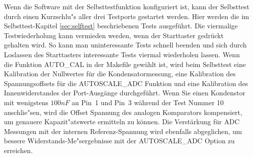 Wenn die Software mit der Selbsttestfunktion konfiguriert ist, kann der Selbsttest durch einen Kurzschlu"s aller drei
Testports gestartet werden.
Hier werden die im Selbsttest-Kapitel \ref{sec:selftest} beschriebenen Tests ausgef\"uhrt. Die viermalige Testwiederholung
kann vermieden werden, wenn der Starttaster gedr\"uckt gehalten wird. So kann man uninteressante Tests schnell beenden und
sich durch Loslassen des Starttasters interessante Tests viermal wiederholen lassen.
Wenn die Funktion AUTO\_CAL in der Makefile gew\"ahlt ist, wird beim Selbsttest eine Kalibration der Nullwertes f\"ur die
Kondensatormessung, eine Kalibration des Spannungsoffsets f\"ur die AUTOSCALE\_ADC Funktion  und 
eine Kalibration des Innenwiderstandes der Port-Ausg\"ange durchgef\"uhrt.
Wenn Sie einen Kondenstor mit wenigstens \(100 nF\) an Pin~1 und Pin~3 w\"ahrend der Test Nummer 10 anschlie"sen,
wird die Offset Spannung des analogen Komparators kompensiert, um genauere Kapazit"atswerte ermitteln zu k\"onnen.
Die Verst\"arkung f\"ur ADC Messungen mit der internen Referenz-Spannung wird ebenfalls abgeglichen, um
bessere Widerstands-Me"sergebnisse mit der AUTOSCALE\_ADC Option zu erreichen.

